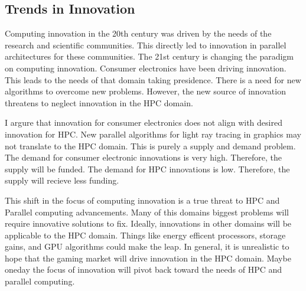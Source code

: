\subsection{Trends in Innovation}
Computing innovation in the 20th century was driven by the needs of the research and scientific communities.
This directly led to innovation in parallel architectures for these communities.
The 21st century is changing the paradigm on computing innovation.
Consumer electronics have been driving innovation.
This leads to the needs of that domain taking presidence.
There is a need for new algorithms to overcome new problems.
However, the new source of innovation threatens to neglect innovation in the HPC domain.

\par
I argure that innovation for consumer electronics does not align with desired innovation for HPC.
New parallel algorithms for light ray tracing in graphics may not translate to the HPC domain.
This is purely a supply and demand problem. 
The demand for consumer electronic innovations is very high.
Therefore, the supply will be funded.
The demand for HPC innovations is low.
Therefore, the supply will recieve less funding.

\par 
This shift in the focus of computing innovation is a true threat to HPC and Parallel computing advancements.
Many of this domains biggest problems will require innovative solutions to fix.
Ideally, innovations in other domains will be applicable to the HPC domain.
Things like energy efficent processors, storage gains, and GPU algorithms could make the leap.
In general, it is unrealistic to hope that the gaming market will drive innovation in the HPC domain. 
Maybe oneday the focus of innovation will pivot back toward the needs of HPC and parallel computing.
